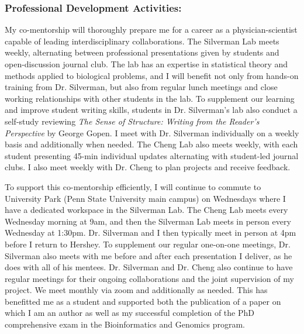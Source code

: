 \documentclass{NIHGrant}
\begin{document}
\subsubsection*{Professional Development Activities:}
My co-mentorship will thoroughly prepare me for a career as a physician-scientist capable of leading interdisciplinary collaborations. The Silverman Lab meets weekly, alternating between professional presentations given by students and open-discussion journal club. The lab has an expertise in statistical theory and methods applied to biological problems, and I will benefit not only from hands-on training from Dr. Silverman, but also from regular lunch meetings and close working relationships with other students in the lab. To supplement our learning and improve student writing skills, students in Dr. Silverman's lab also conduct a self-study reviewing \textit{The Sense of Structure: Writing from the Reader's Perspective} by George Gopen. I meet with Dr. Silverman individually on a weekly basis and additionally when needed. The Cheng Lab also meets weekly, with each student presenting 45-min individual updates alternating with student-led journal clubs. I also meet weekly with Dr. Cheng to plan projects and receive feedback.

To support this co-mentorship efficiently, I will continue to commute to University Park (Penn State University main campus) on Wednesdays where I have a dedicated workspace in the Silverman Lab. The Cheng Lab meets every Wednesday morning at 9am, and then the Silverman Lab meets in person every Wednesday at 1:30pm. Dr. Silverman and I then typically meet in person at 4pm before I return to Hershey. To supplement our regular one-on-one meetings, Dr. Silverman also meets with me before and after each presentation I deliver, as he does with all of his mentees. Dr. Silverman and Dr. Cheng also continue to have regular meetings for their ongoing collaborations and the joint supervision of my project. We meet monthly via zoom and additionally as needed. This has benefitted me as a student and supported both the publication of a paper on which I am an author as well as my successful completion of the PhD comprehensive exam in the Bioinformatics and Genomics program. %
\end{document}

